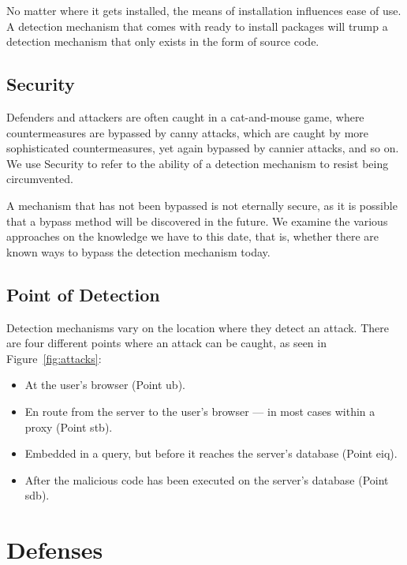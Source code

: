 \documentclass[conference]{IEEEtran}
\begin{document}
No matter where it gets installed, the means of installation influences
ease of use. A detection mechanism that comes with ready to install
packages will trump a detection mechanism that only exists in the form
of source code. 

\subsection{Security}

Defenders and attackers are often caught in a cat-and-mouse game,
where countermeasures are bypassed by canny attacks, which are caught
by more sophisticated countermeasures, yet again bypassed by cannier
attacks, and so on. We use Security to refer to the ability of a
detection mechanism to resist being circumvented. 

A mechanism that has not been bypassed is not eternally secure, as it
is possible that a bypass method will be discovered in the future. We
examine the various approaches on the knowledge we have to this date,
that is, whether there are known ways to bypass the detection
mechanism today.

\subsection{Point of Detection}

Detection mechanisms vary on the location where they detect an attack.
There are four different points where an attack can be caught, as seen
in Figure~\ref{fig:attacks}:
\begin{itemize}
\item At the user's browser (Point {\sc ub}).
\item En route from the server to the user's browser --- in most cases
within a proxy (Point {\sc s}t{\sc b}).
\item Embedded in a query, but before it reaches the server's database
  (Point {\sc e}i{\sc q}).
\item After the malicious code has been executed on the server's
  database (Point {\sc sdb}).
\end{itemize}

\section{Defenses}
\label{sec:defs}
\end{document}
